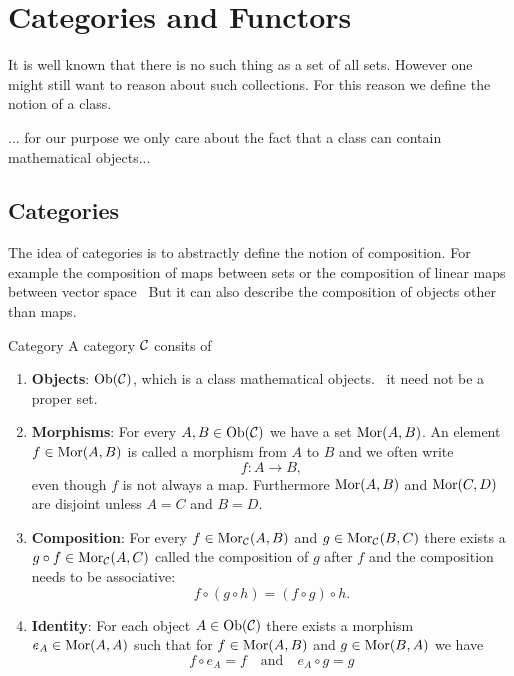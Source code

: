 \chapter{Categories and Functors}
It is well known \source that there is no such thing as a set of all sets. However one might still want to reason about such collections. For this reason we define the notion of a class.

... for our purpose we only care about the fact that a class can contain mathematical objects...

\section{Categories}
The idea of categories is to abstractly define the notion of composition.
For example the composition of maps between sets or the composition of linear maps between vector space \etc\
But it can also describe the composition of objects other than maps.

\begin{definition}{Category}{}
\cite{Roman2017} \source A category $\mathcal{C}$ consits of
\begin{enumerate}
    \item \textbf{Objects}: $\mathrm {Ob}(\mathcal{C})$, which is a class mathematical objects. \Ie\ it need not be a proper set.
    
    \item \textbf{Morphisms}: For every $A, B \in \mathrm {Ob}(\mathcal{C})$ we have a set $\mathrm {Mor}(A,B)$. An element $f \in \mathrm {Mor}(A,B)$ is called a morphism from $A$ to $B$ and we often write 
    $$
    f: A \to B,
    $$
    even though $f$ is not always a map. Furthermore $\mathrm {Mor}(A,B)$ and $\mathrm {Mor}(C,D)$ are disjoint unless $A = C$ and $B = D$.
    
    \item \textbf{Composition}: For every $f \in \mathrm {Mor}_{\mathcal{C}}(A,B)$ and $g \in \mathrm {Mor}_{\mathcal{C}}(B,C)$ there exists a $g \circ f \in \mathrm {Mor}_{\mathcal{C}}(A,C)$ called the composition of $g$ after $f$ and the composition needs to be associative: 
    $$
    f \circ (g \circ h) = (f \circ g) \circ h.
    $$

    \item \textbf{Identity}: For each object $A \in \mathrm {Ob}(\mathcal{C})$ there exists a morphism $e_A \in \mathrm {Mor}(A,A)$ such that for $f \in \mathrm {Mor}(A,B)$ and $g \in \mathrm {Mor}(B,A)$ we have
    $$
    f \circ e_A = f \quad \text{and} \quad e_A \circ g = g
    $$
\end{enumerate}
\end{definition}

